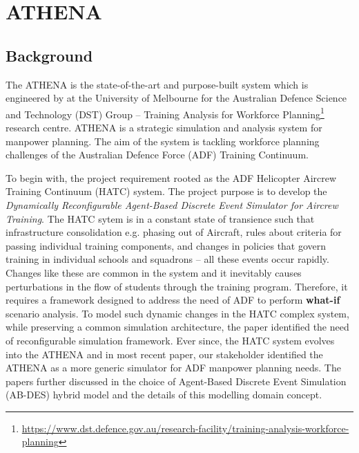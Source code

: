 \chapter{ATHENA} 

\label{Chapter2}

\section{Background}

The ATHENA  is the state-of-the-art and purpose-built system which is engineered by \textit{\groupname} at the University of Melbourne for the Australian Defence Science and Technology (DST) Group -- Training Analysis for Workforce Planning\footnote{\url{https://www.dst.defence.gov.au/research-facility/training-analysis-workforce-planning}} research centre. ATHENA is a strategic simulation and analysis system for manpower planning. The aim of the system is tackling workforce planning challenges of the Australian Defence Force (ADF) Training Continuum. 

To begin with, the project requirement rooted as the ADF Helicopter Aircrew Training Continuum (HATC) system. The project purpose is to develop the \textit{Dynamically Reconfigurable Agent-Based Discrete Event Simulator for Aircrew Training}. The HATC\parencite{HATC} sytem is in a constant state of transience such that infrastructure consolidation e.g. phasing out of Aircraft, rules about criteria for passing individual training components, and changes in policies that govern training in individual schools and squadrons -- all these events occur rapidly. Changes like these are common in the system and it inevitably causes perturbations in the flow of students through the training program. Therefore, it requires a framework designed to address the need of ADF to perform \textbf{what-if} scenario analysis. To model such dynamic changes in the HATC complex system, while preserving a common simulation architecture, the paper\parencite{HATC} identified the need of reconfigurable simulation framework. Ever since, the HATC system evolves into the ATHENA and in most recent paper\parencite{8248116}, our stakeholder identified the ATHENA as a more generic simulator for ADF manpower planning needs. 
The papers further discussed in the choice of Agent-Based Discrete Event Simulation (AB-DES) hybrid model and the details of this modelling domain concept.

